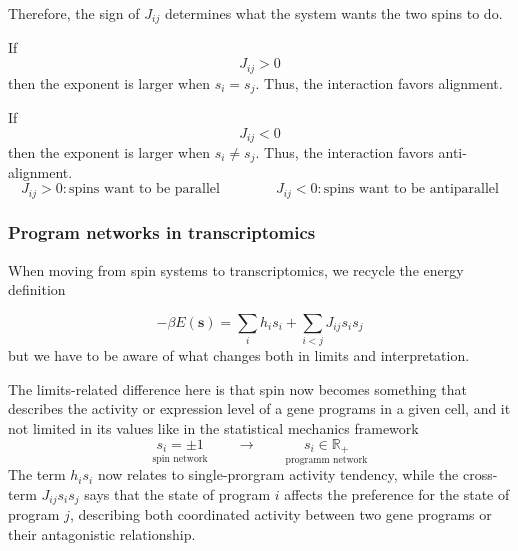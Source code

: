 \documentclass[11pt,a4paper]{article}
\begin{document}
Therefore, the sign of $J_{ij}$ determines what the system wants the two spins to do.

If
\[
J_{ij} > 0
\]
then the exponent is larger when $s_i = s_j$. Thus, the interaction favors {alignment}.

If
\[
J_{ij} < 0
\]
then the exponent is larger when $s_i \neq s_j$. Thus, the interaction favors {anti-alignment}.
\[
\boxed{
	J_{ij} > 0: \text{spins want to be parallel}
}
\qquad \qquad 
\boxed{
	J_{ij} < 0: \text{spins want to be antiparallel}
}
\]

%
% 

\subsubsection{Program networks in transcriptomics}

When moving from spin systems to transcriptomics, we recycle the energy definition 

\[ 
-\beta E(\bm{s}) = 
\sum_i h_i s_i
+
\sum_{i<j}J_{ij}s_is_j
\]
but we have to be aware of what changes both in limits and interpretation.

The limits-related difference here is that spin now becomes something that describes the activity or expression level of a gene programs in a given cell, and it not limited in its values like in the statistical mechanics framework
\[ \underset{\text{spin network}}{s_i = \pm 1} \qquad \longrightarrow \qquad \underset{\text{programm network}}{s_i \in \mathbb{R}_+}\]
The term 
$\boxed{h_i s_i}$
now relates to single-prorgram activity tendency, while the cross-term 
$\boxed{J_{ij} s_i s_j}$
says that the state of program $i$ affects the preference for the state of program $j$, describing both coordinated activity between two gene programs or their antagonistic relationship.

\end{document}
